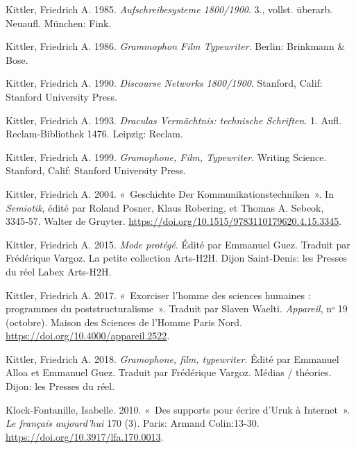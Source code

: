 \begin{CSLReferences}{1}{0}
\leavevmode{}%
Kittler, Friedrich A. 1985. \emph{{Aufschreibesysteme 1800/1900}}. 3.,
vollst. {ü}berarb. Neuaufl. {M{ü}nchen}: {Fink}.

\leavevmode{}%
Kittler, Friedrich A. 1986. \emph{Grammophon {Film Typewriter}}.
{Berlin}: {Brinkmann \& Bose}.

\leavevmode{}%
Kittler, Friedrich A. 1990. \emph{Discourse {Networks} 1800/1900}.
{Stanford, Calif}: {Stanford University Press}.

\leavevmode{}%
Kittler, Friedrich A. 1993. \emph{{Draculas Verm{ä}chtnis: technische
Schriften}}. 1. Aufl. {Reclam-Bibliothek} 1476. {Leipzig}: {Reclam}.

\leavevmode{}%
Kittler, Friedrich A. 1999. \emph{Gramophone, {Film}, {Typewriter}}.
Writing {Science}. {Stanford, Calif}: {Stanford University Press}.

\leavevmode{}%
Kittler, Friedrich A. 2004. {«~Geschichte Der
{Kommunikationstechniken}~»}. In \emph{Semiotik}, édité par Roland
Posner, Klaus Robering, et Thomas A. Sebeok, 3345‑57. {Walter de
Gruyter}. \url{https://doi.org/10.1515/9783110179620.4.15.3345}.

\leavevmode{}%
Kittler, Friedrich A. 2015. \emph{{Mode prot{é}g{é}}}. Édité par
Emmanuel Guez. Traduit par Frédérique Vargoz. {La petite collection
Arts-H2H}. {Dijon Saint-Denis}: {les Presses du r{é}el Labex Arts-H2H}.

\leavevmode{}%
Kittler, Friedrich A. 2017. {«~{Exorciser l'homme des sciences humaines
: programmes du poststructuralisme}~»}. Traduit par Slaven Waelti.
\emph{Appareil}, nᵒ 19 (octobre). {Maison des Sciences de l'Homme Paris
Nord}. \url{https://doi.org/10.4000/appareil.2522}.

\leavevmode{}%
Kittler, Friedrich A. 2018. \emph{{Gramophone, film, typewriter}}. Édité
par Emmanuel Alloa et Emmanuel Guez. Traduit par Frédérique Vargoz.
{M{é}dias / th{é}ories}. {Dijon}: {les Presses du r{é}el}.

\leavevmode{}%
Klock-Fontanille, Isabelle. 2010. {«~{Des supports pour {é}crire d'Uruk
{à} Internet}~»}. \emph{Le fran{ç}ais aujourd'hui} 170 (3). {Paris}:
{Armand Colin}:13‑30. \url{https://doi.org/10.3917/lfa.170.0013}.


\end{CSLReferences}
